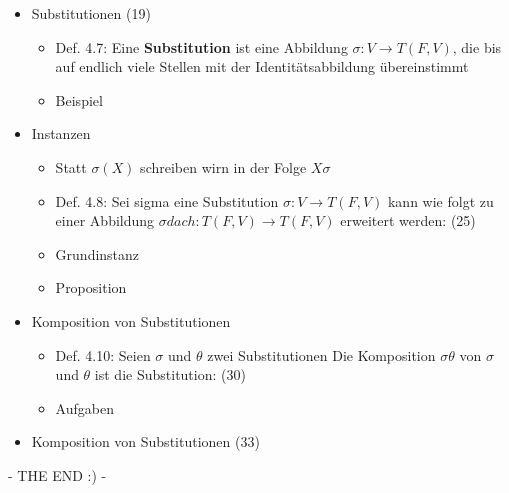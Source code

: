 \documentclass[a4paper, 12pt] {article} %
\begin{document}
\begin{itemize}
	\item Substitutionen (19)
	\begin{itemize}
		\item Def. 4.7: Eine \textbf{Substitution} ist eine Abbildung 					\begin{math} \sigma : V \to T(F,V)\end{math}, die bis auf 					endlich viele Stellen mit der Identitätsabbildung 							übereinstimmt
		\item Beispiel
	\end{itemize}
	\item Instanzen
	\begin{itemize}
		\item Statt \begin{math} \sigma(X) \end{math} schreiben wirn in 				der Folge \begin{math} X\sigma \end{math}
		\item Def. 4.8: Sei sigma eine Substitution \begin{math} \sigma 				: V \to T(F,V)\end{math} kann wie folgt zu einer Abbildung 					\begin{math} \sigma dach: T(F,V) \to T(F,V)\end{math} 						erweitert werden: (25)
		\item Grundinstanz
		\item Proposition
	\end{itemize}
	\item Komposition von Substitutionen
	\begin{itemize}
		\item Def. 4.10: Seien \(\sigma\) und \(\theta\) zwei 							Substitutionen Die 	Komposition \(\sigma\theta\) von 						\(\sigma\) und \(\theta\) ist die Substitution: (30)
		\item Aufgaben
	\end{itemize}
	\item Komposition von Substitutionen (33)
\end{itemize}



- THE END  :) - 

\begin{lstlisting}

\end{lstlisting}
\end{document}
